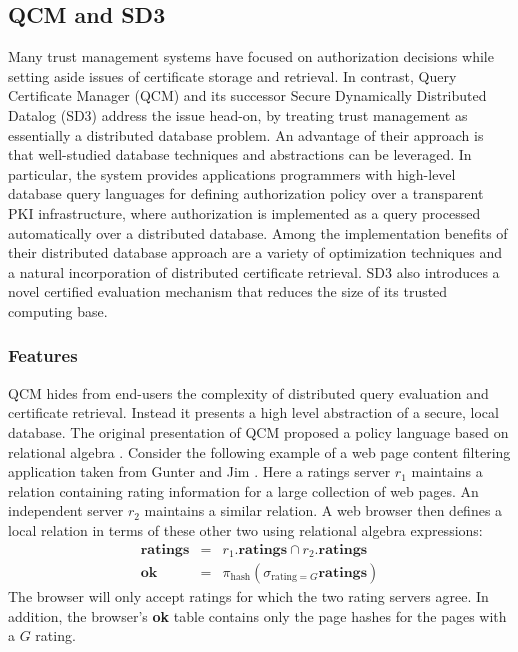 \subsection{QCM and SD3}

Many trust management systems have focused on authorization decisions
while setting aside issues of certificate storage and retrieval.  In
contrast, Query Certificate Manager (QCM)
\cite{Gunter:DALSI,Gunter:ADDUQCM,Gunter:PDCR} and its successor Secure
Dynamically Distributed Datalog (SD3)
\cite{Jim:STMSCE,Jim:DDQE} address the issue head-on, by treating 
trust management as essentially a distributed database problem.  An
advantage of their approach is that well-studied database techniques
and abstractions can be leveraged.  In particular, the system provides
applications programmers with high-level database query languages for
defining authorization policy over a transparent PKI infrastructure,
where authorization is implemented as a query processed automatically
over a distributed database.  Among the implementation benefits of
their distributed database approach are a variety of optimization
techniques and a natural incorporation of distributed certificate
retrieval.  SD3 also introduces a novel certified evaluation mechanism
that reduces the size of its trusted computing base.

\subsubsection{Features}
QCM hides from end-users the complexity of distributed query
evaluation and certificate retrieval. Instead it presents a high level
abstraction of a secure, local database.  The original presentation of
QCM proposed a policy language based on relational algebra
\cite{Gunter:DALSI}.  Consider the following example of a web page
content filtering application taken from Gunter and Jim
\cite{Gunter:DALSI}. Here a ratings server $r_1$ maintains a relation
 containing rating information for a large
collection of web pages.  An independent server $r_2$ maintains a
similar relation. A web browser then defines a local relation in terms
of these other two using relational algebra expressions:
\begin{eqnarray*}
\textbf{ratings} & = &
   r_1.\textbf{ratings} \cap r_2.\textbf{ratings} \\
\textbf{ok}      & = &
   \pi_{\text{hash}}(\sigma_{\text{rating} = G}\textbf{ratings})
\end{eqnarray*}
The browser will only accept ratings for which the two rating servers
agree. In addition, the browser's \textbf{ok} table contains only the
page hashes for the pages with a $G$ rating.

